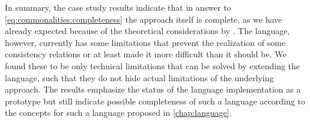 In summary, the case study results indicate that in answer to \autoref{eq:commonalities:completeness} the \commonalities approach itself is complete, as we have already expected because of the theoretical considerations by \textcite{stevens2020BidirectionalTransformationLarge-SoSym}.
The \commonalities language, however, currently has some limitations that prevent the realization of some consistency relations or at least made it more difficult than it should be.
We found these to be only technical limitations that can be solved by extending the language, such that they do not hide actual limitations of the underlying \commonalities approach.
The results emphasize the status of the \commonalities language implementation as a prototype but still indicate possible completeness of such a language according to the concepts for such a language proposed in \autoref{chap:language}.


